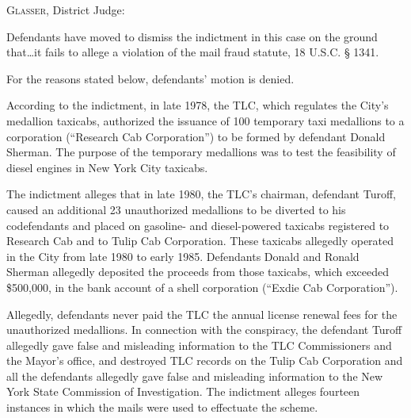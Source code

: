 

\opinion \textsc{Glasser}, District Judge:

Defendants have moved to dismiss the indictment in this case on the ground
that\ldots it fails to allege a violation of the mail fraud statute, 18 U.S.C.
{\S} 1341.

For the reasons stated below, defendants' motion is denied.


According to the indictment, in late 1978, the TLC, which regulates the City's
medallion taxicabs, authorized the issuance of 100 temporary taxi medallions to
a corporation (``Research Cab Corporation'') to be formed by defendant Donald
Sherman. The purpose of the temporary medallions was to test the feasibility of
diesel engines in New York City taxicabs.

The indictment alleges that in late 1980, the TLC's chairman, defendant Turoff,
caused an additional 23 unauthorized medallions to be diverted to his
codefendants and placed on gasoline- and diesel-powered taxicabs registered to
Research Cab and to Tulip Cab Corporation. These taxicabs allegedly operated in
the City from late 1980 to early 1985. Defendants Donald and Ronald Sherman
allegedly deposited the proceeds from those taxicabs, which exceeded \$500,000,
in the bank account of a shell corporation (``Exdie Cab Corporation'').

Allegedly, defendants never paid the TLC the annual license renewal fees for the
unauthorized medallions. In connection with the conspiracy, the defendant
Turoff allegedly gave false and misleading information to the TLC Commissioners
and the Mayor's office, and destroyed TLC records on the Tulip Cab Corporation
and all the defendants allegedly gave false and misleading information to the
New York State Commission of Investigation. The indictment alleges fourteen
instances in which the mails were used to effectuate the scheme.


